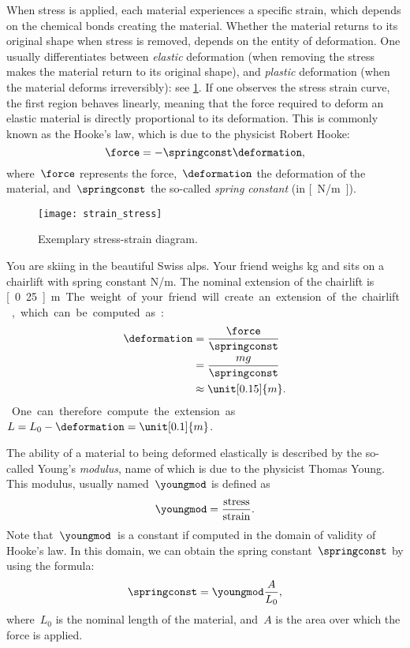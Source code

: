 When stress is applied, each material experiences a specific strain, which depends on the chemical bonds creating the material.
Whether the material returns to its original shape when stress is removed, depends on the entity of deformation.
One usually differentiates between \emph{elastic} deformation (when removing the stress makes the material return to its original shape), and \emph{plastic} deformation (when the material deforms irreversibly): see \cref{fig:stress_strain}.
If one observes the stress \vs strain curve, the first region behaves linearly, meaning that the force required to deform an elastic material is directly proportional to its deformation.
This is commonly known as the Hooke's law, which is due to the physicist Robert Hooke:
\begin{equation*}
	\force=-\springconst \deformation,
\end{equation*}
where~$\force$ represents the force,~$\deformation$ the deformation of the material, and~$\springconst$ the so-called \emph{spring constant} (in \unit[]{[N/m]}).

\begin{figure}[h]
	\centering
	\texttt{[image: strain\_stress]}
	\caption{Exemplary stress-strain diagram. }
	\label{fig:stress_strain}
\end{figure}

\begin{example}
	You are skiing in the beautiful Swiss alps.
	Your friend weighs \unit[100]{kg} and sits on a chairlift with spring constant \unit[4,000]{N/m}.
	The nominal extension of the chairlift is \unit[0.25]{m}.
	The weight of your friend will create an extension of the chairlift, which can be computed as:
	\begin{equation*}
		\begin{aligned}
			\deformation & =\frac{\force}{\springconst} \\
			             & =\frac{mg}{\springconst}     \\
			             & \approx \unit[0.15]{m}.
		\end{aligned}
	\end{equation*}
	One can therefore compute the extension as~$L=L_0-\deformation=\unit[0.1]{m}$.
\end{example}

The ability of a material to being deformed elastically is described by the so-called Young's \emph{modulus}, name of which is due to the physicist Thomas Young.
This modulus, usually named~$\youngmod$ is defined as
\begin{equation*}
	\youngmod=\frac{\text{stress}}{\text{strain}}.
\end{equation*}
Note that~$\youngmod$~is a constant if computed in the domain of validity of Hooke's law.
In this domain, we can obtain the spring constant~$\springconst$ by using the formula:
\begin{equation*}
	\springconst=\youngmod \frac{A}{L_0},
\end{equation*}
where~$L_0$ is the nominal length of the material, and~$A$ is the area over which the force is applied.


